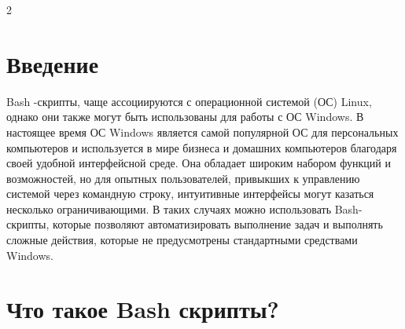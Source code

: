 \documentclass[a4paper,10pt,twoside]{article}
\begin{document}
%

%
%
\begin{multicols}{2}
%
\section*{Введение}

Bash -скрипты, чаще ассоциируются с операционной системой (ОС) Linux, однако они также могут быть использованы для работы с ОС Windows. В настоящее время ОС Windows является самой популярной ОС для персональных компьютеров и используется в мире бизнеса и домашних компьютеров благодаря своей удобной интерфейсной среде. Она обладает широким набором функций и возможностей, но для опытных пользователей, привыкших к управлению системой через командную строку, интуитивные интерфейсы могут казаться несколько ограничивающими. В таких случаях можно использовать Bash-скрипты, которые позволяют автоматизировать выполнение задач и выполнять сложные действия, которые не предусмотрены стандартными средствами Windows.
%
\section{Что такое Bash скрипты?}
%
%

\end{multicols}
\end{document}
